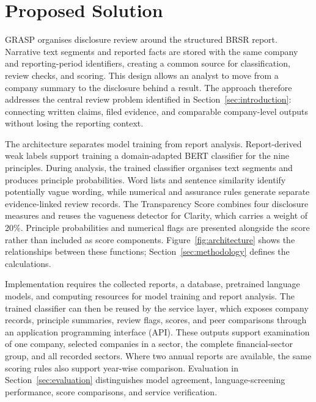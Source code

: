 \section{Proposed Solution}
\label{sec:proposed}

GRASP organises disclosure review around the structured BRSR report. Narrative text segments and reported facts are stored with the same company and reporting-period identifiers, creating a common source for classification, review checks, and scoring. This design allows an analyst to move from a company summary to the disclosure behind a result. The approach therefore addresses the central review problem identified in Section~\ref{sec:introduction}: connecting written claims, filed evidence, and comparable company-level outputs without losing the reporting context.

The architecture separates model training from report analysis. Report-derived weak labels support training a domain-adapted BERT classifier for the nine principles. During analysis, the trained classifier organises text segments and produces principle probabilities. Word lists and sentence similarity identify potentially vague wording, while numerical and assurance rules generate separate evidence-linked review records. The Transparency Score combines four disclosure measures and reuses the vagueness detector for Clarity, which carries a weight of 20\%. Principle probabilities and numerical flags are presented alongside the score rather than included as score components. Figure~\ref{fig:architecture} shows the relationships between these functions; Section~\ref{sec:methodology} defines the calculations.

Implementation requires the collected reports, a database, pretrained language models, and computing resources for model training and report analysis. The trained classifier can then be reused by the service layer, which exposes company records, principle summaries, review flags, scores, and peer comparisons through an application programming interface (API). These outputs support examination of one company, selected companies in a sector, the complete financial-sector group, and all recorded sectors. Where two annual reports are available, the same scoring rules also support year-wise comparison. Evaluation in Section~\ref{sec:evaluation} distinguishes model agreement, language-screening performance, score comparisons, and service verification.
